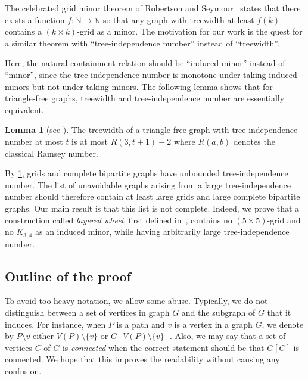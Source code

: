 \documentclass[11pt]{article}
\newcommand{\sm}{\setminus}
\theoremstyle{definition}
\newtheorem{lemma}[theorem]{Lemma}
\theoremstyle{definition}
\begin{document}
The celebrated grid minor
theorem of Robertson and Seymour~\cite{DBLP:journals/jct/RobertsonS86}
states that there exists a function
$f \colon \mathds N \rightarrow \mathds N$ so that any graph with treewidth
at least $f(k)$ contains a $(k \times k)$-grid as a minor.  The
motivation for our work is the quest for a similar theorem with
``tree-independence number'' instead of ``treewidth''.

Here, the natural containment relation should be ``induced minor''
instead of ``minor'', since the tree-independence number is monotone
under taking induced minors but not under taking  minors.  The
following lemma shows that for triangle-free graphs, treewidth and
tree-independence number are essentially equivalent. 

\begin{lemma}[see \cite{DBLP:journals/jctb/DallardMS24}]
  \label{l:ramsey}
  The treewidth of a triangle-free graph with tree-independence number
  at most $t$ is at most $R(3, t+1)-2$ where $R(a, b)$ denotes the
  classical Ramsey number.
\end{lemma}

By \cref{l:ramsey}, grids and complete bipartite graphs have unbounded
tree-independence number.  The list of unavoidable graphs arising from
a large tree-independence number should therefore contain at least
large grids and large complete bipartite graphs.  Our main result is
that this list is not complete. Indeed, we prove that a construction
called \emph{layered wheel}, first defined
in~\cite{DBLP:journals/jgt/SintiariT21}, contains no
$(5\times 5)$-grid and no $K_{3, 4}$ as an induced minor, while having
arbitrarily large tree-independence number.


\subsection*{Outline of the proof}

To avoid too heavy notation, we allow some abuse. Typically, we do not
distinguish between a set of vertices in graph $G$ and the subgraph of
$G$ that it induces.  For instance, when $P$ is a path and $v$ is a
vertex in a graph $G$, we denote by $P\sm v$ either $V(P) \sm \{v\}$
or $G[V(P) \sm \{v\}]$.  Also, we may say that a set of vertices $C$
of $G$ is \emph{connected} when the correct statement should be that
$G[C]$ is connected.  We hope that this improves the readability
without causing any confusion.
\end{document}
